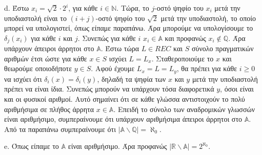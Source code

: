 \documentclass[a4paper, oneside, 11pt]{article}
\theoremstyle{definition}
\begin{document}
d. Έστω $x_i=\sqrt{2}\cdot 2^i$, για κάθε $i\in \mathbb{N}$. Τώρα, το $j$-οστό ψηφίο του $x_i$ μετά την
υποδιαστολή είναι το $(i+j)$-οστό ψηφίο του $\sqrt{2}$ μετά την υποδιαστολή, το οποίο μπορεί να υπολογιστεί,
όπως είπαμε παραπάνω. Άρα μπορούμε να υπολογίσουμε το $\delta_j(x_i)$ για κάθε $i$ και $j$. Συνεπώς για κάθε
$i$ $x_i\in \mathbb{A}$ και προφανώς $x_i\notin \mathbb{Q}$. Άρα υπάρχουν άπειροι άρρητοι στο $\mathbb{A}$.
Έστω τώρα $L\in REC$ και $S$ σύνολο πραγματικών αριθμών έτσι ώστε για κάθε $x\in S$ ισχύει $L=L_x$. 
Σταθεροποιούμε το $x$ και θεωρούμε οποιοδήποτε $y\in S$. Αφού έχουμε $L_x=L=L_y$, θα πρέπει για κάθε $i\geq 0$
να ισχύει ότι $\delta_i(x)=\delta_i(y)$, δηλαδή τα ψηφία των $x$ και $y$ μετά την υποδιαστολή πρέπει να είναι
ίδια. Συνεπώς μπορούν να υπάρχουν τόσα διαφορετικά $y$, όσοι είναι και οι φυσικοί αριθμοί. Αυτό σημαίνει ότι
σε κάθε γλώσσα αντιστοιχούν το πολύ αριθμήσιμα σε πλήθος άρρητα $x\in \mathbb{A}$. Επειδή το σύνολο των
αναδρομικών γλωσσών είναι αριθμήσιμο, συμπεραίνουμε ότι υπάρχουν αριθμήσιμα άπειροι άρρητοι στο $\mathbb{A}$.
Από τα παραπάνω συμπεραίνουμε ότι $|\mathbb{A}\backslash\mathbb{Q}|=\aleph_0$.

e. Όπως είπαμε το $\mathbb{A}$ είναι αριθμήσιμο. Άρα προφανώς $|\mathbb{R}\backslash\mathbb{A}|=2^{\aleph_0}$.
\end{document}
